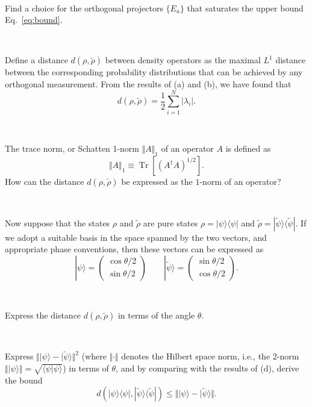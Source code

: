\documentclass[a4paper,11pt]{article}
\DeclareMathOperator{\Tr}{Tr}
\newcommand{\ket}[1]{|#1\rangle}
\newcommand{\braket}[2]{\langle #1|#2\rangle}
\newcommand{\ketbra}[2]{| #1 \rangle \langle #2 |}
\begin{document}
~

 Find a choice for the orthogonal projectors $\{E_a\}$ that saturates the upper bound Eq.~\eqref{eq:bound}.

~

Define a distance $d(\rho,\tilde{\rho})$ between density operators as the maximal $L^1$ distance between the corresponding probability distributions that can be achieved by any orthogonal measurement.
From the results of (a) and (b), we have found that
\begin{equation}
d(\rho,\tilde \rho) = \frac{1}{2} \sum_{i=1}^N |\lambda_i|.
\end{equation}

~

 The trace norm, or Schatten 1-norm $\Vert A \Vert_1$ of an operator $A$ is defined as
\begin{equation}
\Vert A \Vert_1 \equiv \Tr \left[ (A^\dagger A)^{1/2} \right].
\end{equation}
How can the distance $d(\rho,\tilde \rho)$ be expressed as the $1$-norm of an operator?

~

Now suppose that the states $\rho$ and $\tilde \rho$ are pure states $\rho = \ketbra{\psi}{\psi}$ and $\tilde{\rho} = \ketbra{\tilde \psi}{\tilde \psi}$.
If we adopt a suitable basis in the space spanned by the two vectors, and appropriate phase conventions, then these vectors can be expressed as
\begin{equation}
\ket{\psi} = \left( \begin{array}{c} \cos \theta/2 \\ \sin \theta/2 \end{array} \right) \qquad \ket{\tilde \psi} = \left( \begin{array}{c} \sin \theta/2 \\ \cos \theta/2 \end{array} \right) .
\end{equation}

~

 Express the distance $d(\rho,\tilde \rho)$ in terms of the angle $\theta$.

~

 Express $\Vert \ket{\psi} - \ket{\tilde \psi} \Vert^2$ (where $\Vert \cdot \Vert$ denotes the Hilbert space norm, i.e., the 2-norm $\Vert \ket{\psi} \Vert = \sqrt{\braket{\psi}{\psi}}$) in terms of $\theta$, and by comparing with the results of (d), derive the bound
\begin{equation}
d(\ketbra{\psi}{\psi},\ketbra{\tilde \psi}{\tilde \psi}) \leq \Vert \ket{\psi} - \ket{\tilde \psi} \Vert .
\end{equation}
\end{document}
